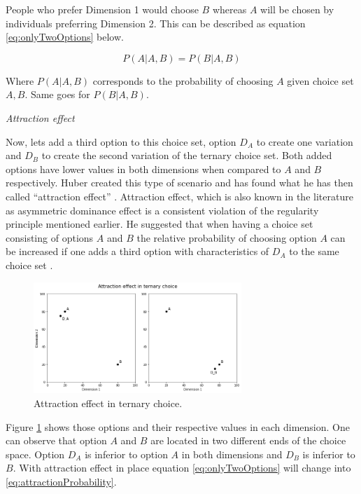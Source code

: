 \documentclass[a4paper,12pt]{article}
\newcommand{\citeyearonly}[1]{\citeyearpar{#1}}
\begin{document}
People who prefer Dimension 1 would choose $B$ whereas $A$ will be chosen by individuals preferring Dimension 2. This can be described as equation \ref{eq:onlyTwoOptions} below.

\begin{equation}\label{eq:onlyTwoOptions}
    P(A|A,B) = P(B|A,B)
\end{equation}

Where $P(A|A,B)$ corresponds to the probability of choosing $A$ given choice set $A,B$. Same goes for $P(B|A,B)$.

\textit{Attraction effect}

Now, lets add a third option to this choice set, option $D_A$ to create one variation and $D_B$ to create the second variation of the ternary choice set. Both added options have lower values in both dimensions when compared to $A$ and $B$ respectively. Huber created this type of scenario and has found what he has then called ``attraction effect'' \citeyearonly{huberEtAl82}. Attraction effect, which is also known in the literature as asymmetric dominance effect is a consistent violation of the regularity principle mentioned earlier. He suggested that when having a choice set consisting of options $A$ and $B$ the relative probability of choosing option $A$ can be increased if one adds a third option with characteristics of $D_A$ to the same choice set \citeyearonly{huberEtAl82}.  

\begin{figure}[h]
    \centering
    \includegraphics[width=0.7\textwidth]{staticFiles/attractionEffect.png}
    \caption{Attraction effect in ternary choice.} %
    \label{fig:attractionEffect} %

\end{figure}

Figure \ref{fig:attractionEffect} shows those options and their respective values in each dimension. One can observe that option $A$ and $B$ are located in two different ends of the choice space. Option $D_A$ is inferior to option $A$ in both dimensions and $D_B$ is inferior to $B$. With attraction effect in place equation  \ref{eq:onlyTwoOptions} will change into \ref{eq:attractionProbability}.
\end{document}
